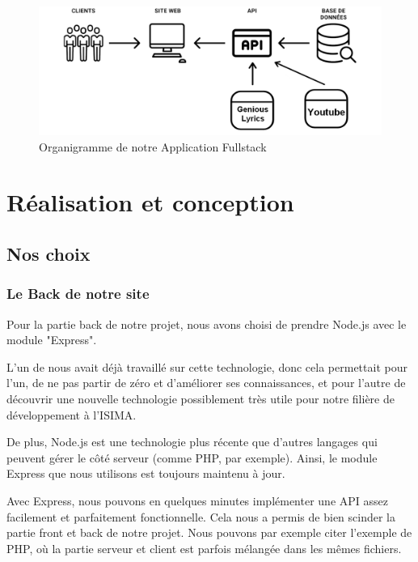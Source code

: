 \documentclass[12pt,french]{article}
\begin{document}
\begin{figure}[H]
	\centering
	\includegraphics[scale=0.4]{fullstack.png}
	\caption{Organigramme de notre Application Fullstack}    
\end{figure}

\section{Réalisation et conception}

\subsection{Nos choix}

\subsubsection{Le Back de notre site}

Pour la partie back de notre projet, nous avons choisi de prendre Node.js avec le module "Express".

\medskip

L'un de nous avait déjà travaillé sur cette technologie, donc cela permettait pour l'un, de ne pas partir de zéro et d'améliorer ses connaissances, et pour l'autre de découvrir une nouvelle technologie possiblement très utile pour notre filière de développement à l'ISIMA.

\medskip

De plus, Node.js est une technologie plus récente que d'autres langages qui peuvent gérer le côté serveur (comme PHP, par exemple). Ainsi, le module Express que nous utilisons est toujours maintenu à jour.

\medskip

Avec Express, nous pouvons en quelques minutes implémenter une API assez facilement et parfaitement fonctionnelle. Cela nous a permis de bien scinder la partie front et back de notre projet.
Nous pouvons par exemple citer l'exemple de PHP, où la partie serveur et client est parfois mélangée dans les mêmes fichiers.
\end{document}
